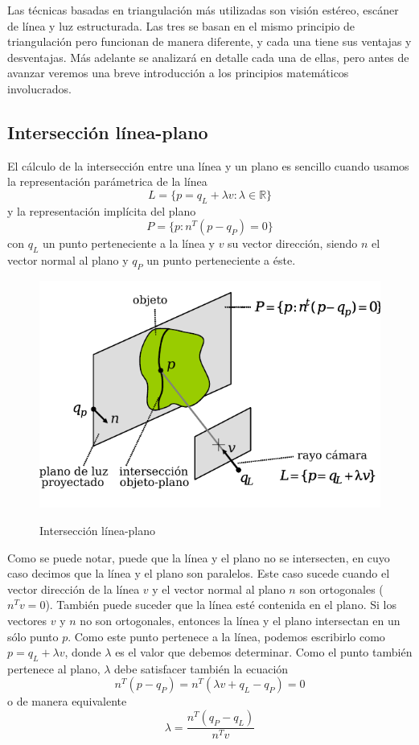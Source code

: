 Las técnicas basadas en triangulación más utilizadas son visión estéreo, escáner de línea y luz estructurada. Las tres se basan en el mismo principio de triangulación pero funcionan de manera diferente, y cada una tiene sus ventajas y desventajas. Más adelante se analizará en detalle cada una de ellas, pero antes de avanzar veremos una breve introducción a los principios matemáticos involucrados.

\subsection{Intersección línea-plano}
El cálculo de la intersección entre una línea y un plano es sencillo cuando usamos la representación parámetrica de la línea \cite{lanman2009build}
    \[ L = \{ p=q_L + \lambda v : \lambda \in \mathbb{R}  \} \]
y la representación implícita del plano
    \[ P = \{ p : n^T (p - q_P) = 0 \} \]
con $q_L$ un punto perteneciente a la línea y $v$ su vector dirección, siendo $n$ el vector normal al plano y $q_P$ un punto perteneciente a éste.

\begin{figure}[bth]
    \myfloatalign
        {\includegraphics[width=0.85\linewidth]{images/intersectionPlaneLine}}
        \caption{Intersección línea-plano}
        \label{fig:intersecionPlaneLine}
\end{figure}

Como se puede notar, puede que la línea y el plano no se intersecten, en cuyo caso decimos que la línea y el plano son paralelos. Este caso sucede cuando el vector dirección de la línea $v$ y el vector normal al plano $n$ son ortogonales ($n^T v = 0$). También puede suceder que la línea esté contenida en el plano. Si los vectores $v$ y $n$ no son ortogonales, entonces la línea y el plano intersectan en un sólo punto $p$. Como este punto pertenece a la línea, podemos escribirlo como $p = q_L + \lambda v$, donde $\lambda$ es el valor que debemos determinar. Como el punto también pertenece al plano, $\lambda$ debe satisfacer también la ecuación
    \[ n^T (p - q_P) = n^T (\lambda v + q_L - q_P) = 0 \]
o de manera equivalente
    \begin{equation*}
        \lambda = \frac {n^T (q_P - q_L)} {n^T v}
    \end{equation*}


